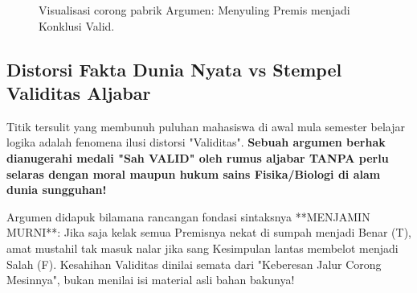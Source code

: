 \begin{figure}[htbp]
\centering
{}
\caption{Visualisasi corong pabrik Argumen: Menyuling Premis menjadi Konklusi Valid.}
\label{fig:struktur-argumen}
\end{figure}

\subsection{Distorsi Fakta Dunia Nyata vs Stempel Validitas Aljabar}

Titik tersulit yang membunuh puluhan mahasiswa di awal mula semester belajar logika adalah fenomena ilusi distorsi "Validitas". \textbf{Sebuah argumen berhak dianugerahi medali "Sah VALID" oleh rumus aljabar TANPA perlu selaras dengan moral maupun hukum sains Fisika/Biologi di alam dunia sungguhan!} \cite{forallx,copi2014}

\begin{definisi}
Argumen didapuk  bilamana rancangan fondasi sintaksnya **MENJAMIN MURNI**: Jika saja kelak semua Premisnya nekat di sumpah menjadi Benar (T), amat mustahil tak masuk nalar jika sang Kesimpulan lantas membelot menjadi Salah (F). Kesahihan Validitas dinilai semata dari "Keberesan Jalur Corong Mesinnya", bukan menilai isi material asli bahan bakunya!
\end{definisi}

